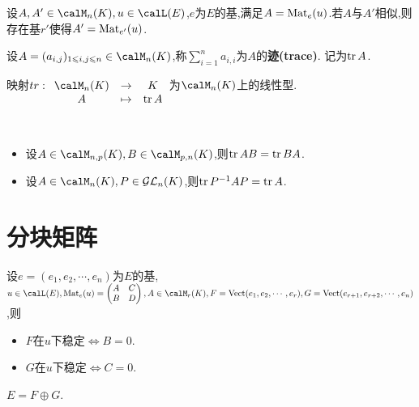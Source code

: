 \begin{prop}
    设$A, A' \in \calM_n(K), u \in \calL(E)$,$e$为$E$的基,满足$A = \operatorname{Mat}_e(u)$.若$A$与$A'$相似,则存在基$r'$使得$A' = \operatorname{Mat}_{e'}(u)$.
\end{prop}

\begin{deff}
    设$A = (a_{i, j})_{1 \leqslant i, j \leqslant n} \in \calM_n(K)$,称$\sum\limits_{i = 1}^n a_{i, i}$为$A$的\textbf{迹(trace)}.
    记为$\operatorname{tr} A$.
\end{deff}

\begin{prop}
    映射$tr: \begin{array}[t]{ccc} \calM_n(K) & \to & K \\ A & \tp & \tr A \end{array}$为$\calM_n(K)$上的线性型.
\end{prop}

\begin{prop} $\ $
    \begin{itemize}
        \item 设$A \in \calM_{n, p}(K), B \in \calM_{p, n}(K)$,则$\operatorname{tr} AB = \operatorname{tr} BA$.
        \item 设$A \in \calM_{n}(K), P \in \mathcal{GL}_n(K)$,则$\operatorname{tr} P^{-1}AP = \operatorname{tr} A$.
    \end{itemize}
\end{prop}

\section{分块矩阵}

\begin{prop}
    设$e = (e_1, e_2, \cdots, e_n)$为$E$的基,$u \in \calL(E), \mat_e(u) = \begin{pmatrix} A & C \\ B & D \end{pmatrix},
    A \in \calM_r(K), F = \vect(e_1, e_2, \cdots, e_r), G = \vect(e_{r + 1}, e_{r + 2}, \cdots, e_n)$,则
    \begin{itemize}
        \item $F$在$u$下稳定$\iff B = 0$.
        \item $G$在$u$下稳定$\iff C = 0$.
    \end{itemize}
\end{prop}

\begin{rqq}
    $E = F \oplus G$.
\end{rqq}

